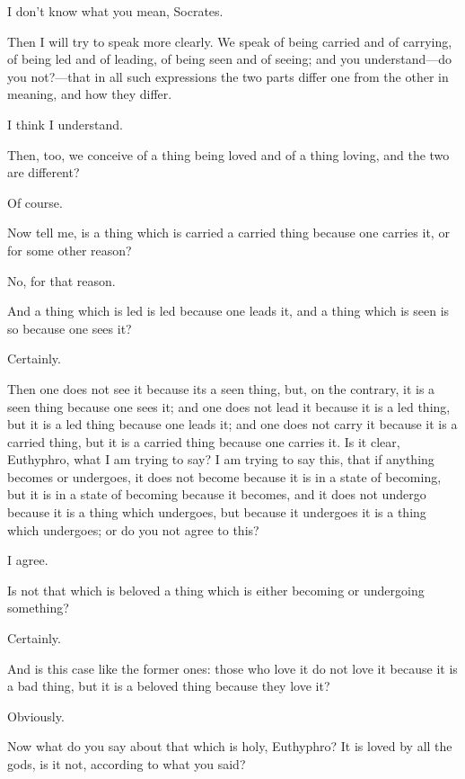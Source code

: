 \documentclass[letterpaper,12pt]{article}
\newcommand{\stephpag}[1]{\marginnote{\small\itshape\fontfamily{ppl}\selectfont #1}}
\begin{document}
\begin{drama}
\euthyphrospeaks
I don't know what you mean, Socrates.

\socratesspeaks
Then I will try to speak more clearly. We speak of being carried and of carrying, of being led and of leading, of being seen and of seeing; and you understand—do you not?—that in all such expressions the two parts differ one from the other in meaning, and how they differ.

\euthyphrospeaks
I think I understand.

\socratesspeaks
Then, too, we conceive of a thing being loved and of a thing loving, and the two are different?

\euthyphrospeaks
Of course. \stephpag{b} 

\socratesspeaks
Now tell me, is a thing which is carried a carried thing because one carries it, or for some other reason?

\euthyphrospeaks
No, for that reason.

\socratesspeaks
And a thing which is led is led because one leads it, and a thing which is seen is so because one sees it?

\euthyphrospeaks
Certainly.

\socratesspeaks
Then one does not see it because its a seen thing, but, on the contrary, it is a seen thing because one sees it; and one does not lead it because it is a led thing, but it is a led thing because one leads it; and one does not carry it because it is a carried thing, but it is a carried thing because one carries it. Is it clear, Euthyphro, \stephpag{c} what I am trying to say? I am trying to say this, that if anything becomes or undergoes, it does not become because it is in a state of becoming, but it is in a state of becoming because it becomes, and it does not undergo because it is a thing which undergoes, but because it undergoes it is a thing which undergoes; or do you not agree to this?

\euthyphrospeaks
I agree.

\socratesspeaks
Is not that which is beloved a thing which is either becoming or undergoing something?

\euthyphrospeaks
Certainly.

\socratesspeaks
And is this case like the former ones: those who love it do not love it because it is a bad thing, but it is a beloved thing because they love it?

\euthyphrospeaks
Obviously.

\socratesspeaks
Now what do you say about that which is holy, \stephpag{d}Euthyphro? It is loved by all the gods, is it not, according to what you said?


\end{drama}
\end{document}
